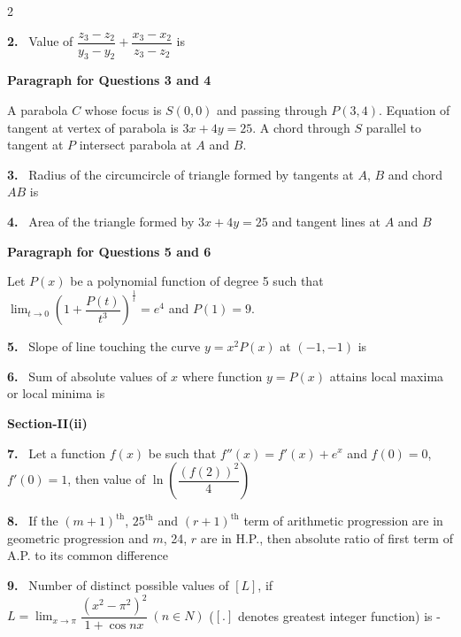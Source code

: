 \documentclass[10pt]{extarticle}
\newcommand{\sect}[1]{\par\smallskip\noindent\textbf{#1}\par}
\newcommand{\qn}[1]{\par\smallskip\noindent\textbf{#1.}~}
\newcommand{\paraq}[2]{\par\smallskip\noindent\textbf{Paragraph for Questions #1 and #2}\par}
\begin{document}
\begin{multicols}{2}
\qn{2} Value of $\dfrac{z_3-z_2}{y_3-y_2}+\dfrac{x_3-x_2}{z_3-z_2}$ is
\paraq{3}{4}
A parabola $C$ whose focus is $S(0,0)$ and passing through $P(3,4)$. Equation of tangent at vertex of parabola is $3x+4y=25$. A chord through $S$ parallel to tangent at $P$ intersect parabola at $A$ and $B$.
\qn{3} Radius of the circumcircle of triangle formed by tangents at $A$, $B$ and chord $AB$ is
\qn{4} Area of the triangle formed by $3x+4y=25$ and tangent lines at $A$ and $B$
\paraq{5}{6}
Let $P(x)$ be a polynomial function of degree 5 such that $\displaystyle\lim_{t\to0}\left(1+\dfrac{P(t)}{t^3}\right)^{\frac1t}=e^4$ and $P(1)=9$.
\qn{5} Slope of line touching the curve $y=x^2P(x)$ at $(-1,-1)$ is
\qn{6} Sum of absolute values of $x$ where function $y=P(x)$ attains local maxima or local minima is
\sect{Section-II(ii)}
\qn{7} Let a function $f(x)$ be such that $f''(x)=f'(x)+e^x$ and $f(0)=0$, $f'(0)=1$, then value of $\ln\left(\dfrac{(f(2))^2}{4}\right)$
\qn{8} If the $(m+1)^{\text{th}}$, $25^{\text{th}}$ and $(r+1)^{\text{th}}$ term of arithmetic progression are in geometric progression and $m$, 24, $r$ are in H.P., then absolute ratio of first term of A.P. to its common difference
\qn{9} Number of distinct possible values of $[L]$, if $L=\displaystyle\lim_{x\to\pi}\dfrac{(x^2-\pi^2)^2}{1+\cos nx}\ (n\in N)$ ($[.]$ denotes greatest integer function) is -
\end{multicols}
\end{document}
